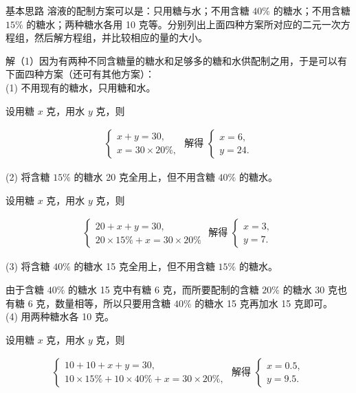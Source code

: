 \documentclass[10pt]{article}
\begin{document}
基本思路 溶液的配制方案可以是：只用糖与水；不用含糖 $40 \%$ 的糖水；不用含糖 $15 \%$ 的糖水；两种糖水各用 10 克等。分别列出上面四种方案所对应的二元一次方程组，然后解方程组，并比较相应的量的大小。

解（1）因为有两种不同含糖量的糖水和足够多的糖和水供配制之用，于是可以有下面四种方案（还可有其他方案）：\\
(1) 不用现有的糖水，只用糖和水。

设用糖 $x$ 克，用水 $y$ 克，则

\begin{align*}
\left\{\begin{array} { l } 
{ x + y = 3 0 , } \\
{ x = 3 0 \times 2 0 \% , }
\end{array} \text { 解得 } \left\{\begin{array}{l}
x=6, \\
y=24 .
\end{array}\right.\right.
\end{align*}

(2) 将含糖 $15 \%$ 的糖水 20 克全用上，但不用含糖 $40 \%$ 的糖水。

设用糖 $x$ 克，用水 $y$ 克，则

\begin{align*}
\left\{\begin{array} { l } 
{ 2 0 + x + y = 3 0 , } \\
{ 2 0 \times 1 5 \% + x = 3 0 \times 2 0 \% }
\end{array} \text { 解得 } \left\{\begin{array}{l}
x=3, \\
y=7 .
\end{array}\right.\right.
\end{align*}

(3) 将含糖 $40 \%$ 的糖水 15 克全用上，但不用含糖 $15 \%$ 的糖水。

由于含糖 $40 \%$ 的糖水 15 克中有糖 6 克，而所要配制的含糖 $20 \%$ 的糖水 30 克也有糖 6 克，数量相等，所以只要用含糖 $40 \%$ 的糖水 15 克再加水 15 克即可。\\
(4) 用两种糖水各 10 克。

设用糖 $x$ 克，用水 $y$ 克，则

\begin{align*}
\left\{\begin{array} { l } 
{ 1 0 + 1 0 + x + y = 3 0 , } \\
{ 1 0 \times 1 5 \% + 1 0 \times 4 0 \% + x = 3 0 \times 2 0 \% , }
\end{array} \text { 解得 } \left\{\begin{array}{l}
x=0.5, \\
y=9.5 .
\end{array}\right.\right.
\end{align*}
\end{document}
